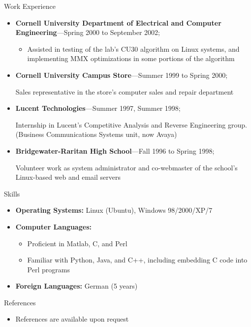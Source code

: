 \documentclass[10pt,oneside]{article}
\newenvironment{ressection}[1]{
	\vspace{4pt}
	{\Large#1}
	\begin{itemize}
	\vspace{3pt}
}{
	\end{itemize}
}
\newcommand{\resitem}[1]{
	\vspace{-4pt}
	\item \begin{flushleft} #1 \end{flushleft}
}
\newcommand{\ressubitem}[1]{
	\vspace{-1pt}
	\item \begin{flushleft} #1 \end{flushleft}
}
\newcommand{\resbigitem}[3]{
	\vspace{-5pt}
	\item
	\textbf{#1}---#2; \quad \textit{#3}
}
\newenvironment{ressubsec}[3]{
	\resbigitem{#1}{#2}{#3}
	\vspace{-2pt}
	\begin{itemize}
}{
	\end{itemize}
}
\newenvironment{reslist}[1]{
	\resitem{\textbf{#1}}
	\vspace{-5pt}
	\begin{itemize}
}{
	\end{itemize}
}
\newenvironment{ressection}[1]{
	\vspace{4pt}
	{\fontfamily{phv}\selectfont\Large#1}
	\begin{itemize}
	\vspace{3pt}
}{
	\end{itemize}
}
\newcommand{\resitem}[1]{
	\vspace{-4pt}
	\item \begin{flushleft} #1 \end{flushleft}
}
\newcommand{\ressubitem}[1]{
	\vspace{-1pt}
	\item \begin{flushleft} #1 \end{flushleft}
}
\newcommand{\resbigitem}[2]{
	\vspace{-5pt}
	\item
	\textbf{#1}---\textit{#2}
}
\newenvironment{ressubsec}[2]{
	\resbigitem{#1}{#2}
	\vspace{-2pt}
	\begin{itemize}
}{
	\end{itemize}
}
\newenvironment{reslist}[1]{
	\resitem{\textbf{#1}}
	\vspace{-5pt}
	\begin{itemize}
}{
	\end{itemize}
}
\begin{document}
\begin{ressection}{Work Experience}
	\begin{ressubsec}{Cornell University Department of Electrical and Computer Engineering}{Spring 2000 to September 2002}
		\ressubitem{Part-time student research in Cornell University's Digital Signal Compression and Video Encoding Research (DISCOVER) lab}
		\ressubitem{Assisted in testing of the lab's CU30 algorithm on Linux systems, and implementing MMX optimizations in some portions of the algorithm}
	\end{ressubsec}

	\begin{ressubsec}{Cornell University Campus Store}{Summer 1999 to Spring 2000}
		\ressubitem{Sales representative in the store's computer sales and repair department}
	\end{ressubsec}

	\begin{ressubsec}{Lucent Technologies}{Summer 1997, Summer 1998}
		\ressubitem{Internship in Lucent's Competitive Analysis and Reverse Engineering group.  (Business Communications Systems unit, now Avaya)}
	\end{ressubsec}

	\begin{ressubsec}{Bridgewater-Raritan High School}{Fall 1996 to Spring 1998}
		\ressubitem{Volunteer work as system administrator and co-webmaster of the school's Linux-based web and email servers}
	\end{ressubsec}

\end{ressection}

\begin{ressection}{Skills}

	\resitem{\textbf{Operating Systems:} Linux (Ubuntu), Windows 98/2000/XP/7}

	\begin{reslist}{Computer Languages:}

		\ressubitem{Proficient in Matlab, C, and Perl}

		\ressubitem{Familiar with Python, Java, and C++, including embedding C code into Perl programs}

	\end{reslist}

	\resitem{\textbf{Foreign Languages:} German (5 years)}

\end{ressection}

\begin{ressection}{References}
  \resitem{References are available upon request}
\end{ressection}
\end{document}

